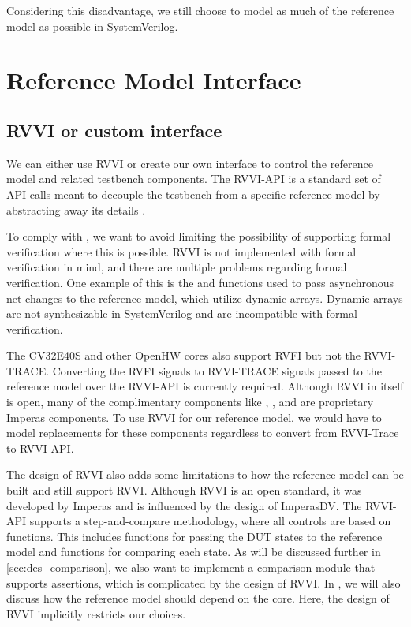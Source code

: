 Considering this disadvantage, we still choose to model as much of the reference model as possible in SystemVerilog. 

\section{Reference Model Interface}
\label{sec:rmInterface}

\subsection{RVVI or custom interface}

We can either use RVVI or create our own interface to control the reference model and related testbench components. The RVVI-API is a standard set of API calls meant to decouple the testbench from a specific reference model by abstracting away its details \cite{riscv-verificationRISCVVerificationInterface2023}. 

To comply with , we want to avoid limiting the possibility of supporting formal verification where this is possible. RVVI is not implemented with formal verification in mind, and there are multiple problems regarding formal verification. One example of this is the  and  functions used to pass asynchronous net changes to the reference model, which utilize dynamic arrays. Dynamic arrays are not synthesizable in SystemVerilog \cite{mehtaIntroductionSystemVerilog2021} and are incompatible with formal verification. 

The CV32E40S and other OpenHW cores also support RVFI but not the RVVI-TRACE. Converting the RVFI signals to RVVI-TRACE signals passed to the reference model over the RVVI-API is currently required. 
Although RVVI in itself is open, many of the complimentary components like , , and  are proprietary Imperas components. To use RVVI for our reference model, we would have to model replacements for these components regardless to convert from RVVI-Trace to RVVI-API. 

The design of RVVI also adds some limitations to how the reference model can be built and still support RVVI. Although RVVI is an open standard, it was developed by Imperas and is influenced by the design of ImperasDV. The RVVI-API supports a step-and-compare methodology, where all controls are based on functions. This includes functions for passing the DUT states to the reference model and functions for comparing each state\cite{riscv-verificationRISCVVerificationInterface2023}. As will be discussed further in \ref{sec:des_comparison}, we also want to implement a comparison module that supports assertions, which is complicated by the design of RVVI. 
In , we will also discuss how the reference model should depend on the core. Here, the design of RVVI implicitly restricts our choices. 


